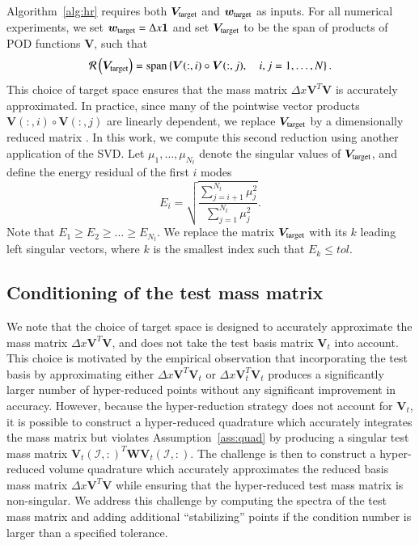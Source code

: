 \documentclass[preprint,10pt]{elsarticle}
\theoremstyle{definition}
\theoremstyle{lemma}
\theoremstyle{theorem}
\theoremstyle{assumption}
\newcommand{\LRp}[1]{\left( #1 \right)}
\newcommand{\LRc}[1]{\left\{ #1 \right\}}
\newcommand{\note}[1]{{\color{blue}{#1}}}
\begin{document}
Algorithm~\ref{alg:hr} requires both $\bm{V}_{\rm target}$ and $\bm{w}_{\rm target}$ as inputs. For all numerical experiments, we set $\bm{w}_{\rm target} = \Delta x \bm{1}$ and set $\bm{V}_{\rm target}$ to be the span of products of POD functions $\bm{V}$, such that
\begin{equation}
\mathcal{R}\LRp{\bm{V}_{\rm target}} = {\rm span}\LRc{\bm{V}(:,i) \circ \bm{V}(:,j), \quad i,j = 1,\ldots, N}.
\label{eq:Vtarget}
\end{equation}
This choice of target space ensures that the mass matrix $\Delta x \bm{V}^T\bm{V}$ is accurately approximated.  In practice, since many of the pointwise vector products $\bm{V}(:,i) \circ \bm{V}(:,j)$ are linearly dependent, we replace $\bm{V}_{\rm target}$ by a dimensionally reduced matrix \cite{hernandez2017dimensional}.  In this work, we compute this second reduction using another application of the SVD.  Let $\mu_{1}, \ldots, \mu_{N_t}$ denote the singular values of $\bm{V}_{\rm target}$, and define the energy residual of the first $i$ modes
\begin{equation}
E_i = \sqrt{\frac{\sum_{j=i+1}^{N_t} \mu_j^2}{\sum_{j=1}^{N_t} \mu_j^2}}.  
\label{eq:svdenergy}
\end{equation}
Note that $E_1 \geq E_2 \geq \ldots \geq E_{N_t}$.  We replace the matrix $\bm{V}_{\rm target}$ with its $k$ leading left singular vectors, where $k$ is the smallest index such that $E_{k} \leq tol$.  

\subsection{Conditioning of the test mass matrix}
\label{sec:condtest}
We note that the choice of target space is designed to accurately approximate the mass matrix $\Delta x \bm{V}^T\bm{V}$, and does not take the test basis matrix $\bm{V}_{t}$ into account.  This choice is motivated by the empirical observation that incorporating the test basis by approximating either $\Delta x \bm{V}^T\bm{V}_{t}$ or $\Delta x \bm{V}_{t}^T\bm{V}_{t}$ produces a significantly larger number of hyper-reduced points without any significant improvement in accuracy.  
However, because the hyper-reduction strategy does not account for $\bm{V}_{t}$, it is possible to construct a hyper-reduced quadrature which accurately integrates the mass matrix but violates Assumption~\ref{ass:quad} by producing a singular test mass matrix $\bm{V}_t\LRp{\mathcal{I},:}^T\bm{W}\bm{V}_t\LRp{\mathcal{I},:}$.  
The challenge is then to construct a hyper-reduced volume quadrature which accurately approximates the reduced basis mass matrix $\Delta x \bm{V}^T\bm{V}$ while ensuring that the hyper-reduced test mass matrix is non-singular.  We address this challenge by computing the spectra of the test mass matrix  and adding additional ``stabilizing'' points if the condition number is larger than a specified tolerance.  
\end{document}
